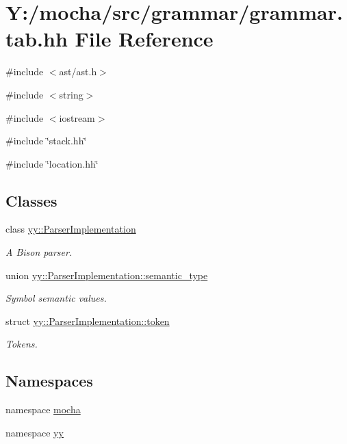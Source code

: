 \hypertarget{grammar_8tab_8hh}{
\section{Y:/mocha/src/grammar/grammar.tab.hh File Reference}
\label{grammar_8tab_8hh}
}
{\ttfamily \#include $<$ast/ast.h$>$}\par
{\ttfamily \#include $<$string$>$}\par
{\ttfamily \#include $<$iostream$>$}\par
{\ttfamily \#include \char`\"{}stack.hh\char`\"{}}\par
{\ttfamily \#include \char`\"{}location.hh\char`\"{}}\par
\subsection*{Classes}
\begin{DoxyCompactItemize}
\item 
class \hyperlink{classyy_1_1_parser_implementation}{yy::ParserImplementation}
\begin{DoxyCompactList}\small\item\em A Bison parser. \end{DoxyCompactList}\item 
union \hyperlink{unionyy_1_1_parser_implementation_1_1semantic__type}{yy::ParserImplementation::semantic\_\-type}
\begin{DoxyCompactList}\small\item\em Symbol semantic values. \end{DoxyCompactList}\item 
struct \hyperlink{structyy_1_1_parser_implementation_1_1token}{yy::ParserImplementation::token}
\begin{DoxyCompactList}\small\item\em Tokens. \end{DoxyCompactList}\end{DoxyCompactItemize}
\subsection*{Namespaces}
\begin{DoxyCompactItemize}
\item 
namespace \hyperlink{namespacemocha}{mocha}
\item 
namespace \hyperlink{namespaceyy}{yy}
\end{DoxyCompactItemize}
